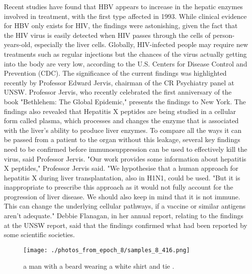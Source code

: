 \documentclass{article}%
\begin{document}
Recent studies have found that HBV appears to increase in the hepatic enzymes involved in treatment, with the first type affected in 1993.\newline%
While clinical evidence for HBV only exists for HIV, the findings were astonishing, given the fact that the HIV virus is easily detected when HIV passes through the cells of person{-}years{-}old, especially the liver cells.\newline%
Globally, HIV{-}infected people may require new treatments such as regular injections but the chances of the virus actually getting into the body are very low, according to the U.S. Centers for Disease Control and Prevention (CDC).\newline%
The significance of the current findings was highlighted recently by Professor Edward Jervis, chairman of the CR Psychiatry panel at UNSW.\newline%
Professor Jervis, who recently celebrated the first anniversary of the book "Bethlehem: The Global Epidemic," presents the findings to New York.\newline%
The findings also revealed that Hepatitis X peptides are being studied in a cellular form called plasma, which processes and changes the enzyme that is associated with the liver's ability to produce liver enzymes.\newline%
To compare all the ways it can be passed from a patient to the organ without this leakage, several key findings need to be confirmed before immunosuppression can be used to effectively kill the virus, said Professor Jervis.\newline%
"Our work provides some information about hepatitis X peptides," Professor Jervis said. "We hypothesise that a human approach for hepatitis X during liver transplantation, also in H1N1, could be used.\newline%
"But it is inappropriate to prescribe this approach as it would not fully account for the progression of liver disease. We should also keep in mind that it is not immune. This can change the underlying cellular pathways, if a vaccine or similar antigens aren't adequate."\newline%
Debbie Flanagan, in her annual report, relating to the findings at the UNSW report, said that the findings confirmed what had been reported by some scientific societies.\newline%

%


\begin{figure}[h!]%
\centering%
\texttt{[image: ./photos\_from\_epoch\_8/samples\_8\_416.png]}%
\caption{a man with a beard wearing a white shirt and tie .}%
\end{figure}

%
\end{document}
